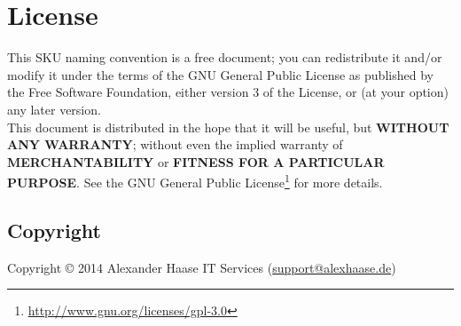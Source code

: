 \section{License}

This SKU naming convention is a free document; you can redistribute it and/or
modify it under the terms of the GNU General Public License as published by the
Free Software Foundation, either version 3 of the License, or (at your option)
any later version. \\

This document is distributed in the hope that it will be useful, but
\textbf{WITHOUT ANY WARRANTY}; without even the implied warranty of
\textbf{MERCHANTABILITY} or \textbf{FITNESS FOR A PARTICULAR PURPOSE}. See the
GNU General Public License\footnote{\url{http://www.gnu.org/licenses/gpl-3.0}}
for more details. \\



\subsection{Copyright}

Copyright \copyright{}   2014 Alexander Haase IT Services
	(\href{mailto:support@alexhaase.de}{support@alexhaase.de})

